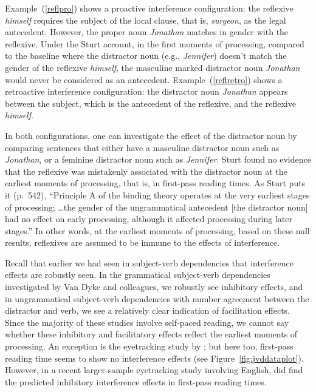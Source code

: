 \documentclass{cambridge7A}\usepackage[]{graphicx}\usepackage[]{color}
\begin{document}
Example~(\ref{reflpro}) shows a  proactive interference configuration: the reflexive \textit{himself} requires the subject of the local clause, that is, \textit{surgeon}, as the legal antecedent. However, the proper noun \textit{Jonathan} matches in gender with the reflexive. Under the Sturt account, in the first moments of processing, compared to the baseline where the distractor noun (e.g., \textit{Jennifer}) doesn't match the gender of the reflexive \textit{himself}, the masculine marked distractor noun \textit{Jonathan} would never be considered as an antecedent. 
Example~(\ref{reflretro}) shows a  retroactive interference configuration:  the distractor noun \textit{Jonathan} appears between the subject, which is the antecedent of the reflexive, and the reflexive \textit{himself}. 

In both  configurations, one can investigate the effect of the distractor noun by comparing sentences that either have a masculine distractor noun such as \textit{Jonathan},  or a feminine distractor noun  such as \textit{Jennifer}.  Sturt found no evidence that the reflexive was mistakenly associated with the distractor noun  at the earliest moments of processing, that is, in first-pass reading times.
As  Sturt puts it (p.\ 542),  ``Principle A of the  binding theory operates at the very earliest stages of processing; \dots the gender of the ungrammatical antecedent [the distractor noun] had no effect on early processing, although it affected processing during later stages.''
In other words, at the earliest moments of processing, based on these  null results, reflexives are assumed to be immune to the effects of interference.

 Recall that earlier we had seen in subject-verb dependencies that interference effects are robustly seen.
 In the grammatical subject-verb dependencies investigated by Van Dyke and colleagues, we robustly see inhibitory effects, and 
in ungrammatical subject-verb dependencies with number agreement between the distractor and verb, we see a relatively clear indication of facilitation effects. Since the majority of these studies involve self-paced reading, we cannot say whether these inhibitory and facilitatory effects reflect the earliest moments of processing. 
An exception is the eyetracking study by \cite{VanDyke2007}; but here too,  first-pass reading time seems to show no interference effects (see Figure~\ref{fig:jvddataplot}). However, in a recent larger-sample eyetracking study involving English, \cite{MertzenEtAlAMLaP2019} did find the predicted inhibitory interference effects in first-pass reading times.
\end{document}
